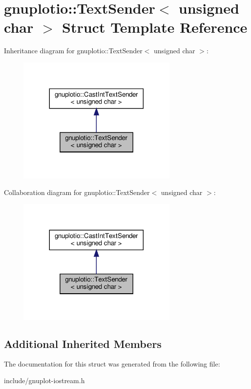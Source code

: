 \hypertarget{structgnuplotio_1_1TextSender_3_01unsigned_01char_01_4}{}\section{gnuplotio\+:\+:Text\+Sender$<$ unsigned char $>$ Struct Template Reference}
\label{structgnuplotio_1_1TextSender_3_01unsigned_01char_01_4}


Inheritance diagram for gnuplotio\+:\+:Text\+Sender$<$ unsigned char $>$\+:\nopagebreak
\begin{figure}[H]
\begin{center}
\leavevmode
\includegraphics[width=224pt]{structgnuplotio_1_1TextSender_3_01unsigned_01char_01_4__inherit__graph}
\end{center}
\end{figure}


Collaboration diagram for gnuplotio\+:\+:Text\+Sender$<$ unsigned char $>$\+:\nopagebreak
\begin{figure}[H]
\begin{center}
\leavevmode
\includegraphics[width=224pt]{structgnuplotio_1_1TextSender_3_01unsigned_01char_01_4__coll__graph}
\end{center}
\end{figure}
\subsection*{Additional Inherited Members}


The documentation for this struct was generated from the following file\+:\begin{DoxyCompactItemize}
\item 
include/gnuplot-\/iostream.\+h\end{DoxyCompactItemize}
